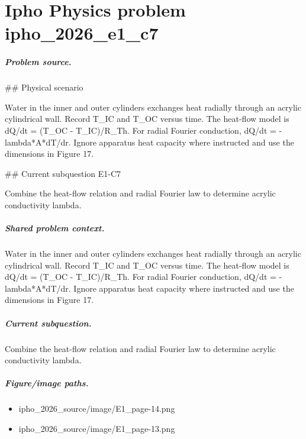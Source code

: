 
\chapter{Ipho Physics problem ipho\_2026\_e1\_c7}
\label{ch:IPhO2026Problems_problem_ipho_2026_e1_c7}

\paragraph{Problem source.}
\#\# Physical scenario

Water in the inner and outer cylinders exchanges heat radially through an
acrylic cylindrical wall.  Record T\_IC and T\_OC versus time.  The heat-flow
model is dQ/dt = (T\_OC - T\_IC)/R\_Th.  For radial Fourier conduction,
dQ/dt = -lambda*A*dT/dr.  Ignore apparatus heat capacity where instructed and
use the dimensions in Figure 17.

\#\# Current subquestion E1-C7

Combine the heat-flow relation and radial Fourier law to determine acrylic conductivity lambda.

\paragraph{Shared problem context.}
Water in the inner and outer cylinders exchanges heat radially through an
acrylic cylindrical wall.  Record T\_IC and T\_OC versus time.  The heat-flow
model is dQ/dt = (T\_OC - T\_IC)/R\_Th.  For radial Fourier conduction,
dQ/dt = -lambda*A*dT/dr.  Ignore apparatus heat capacity where instructed and
use the dimensions in Figure 17.

\paragraph{Current subquestion.}
Combine the heat-flow relation and radial Fourier law to determine acrylic conductivity lambda.

\paragraph{Figure/image paths.}
\begin{itemize}
\item ipho\_2026\_source/image/E1\_page-14.png
\item ipho\_2026\_source/image/E1\_page-13.png
\end{itemize}

